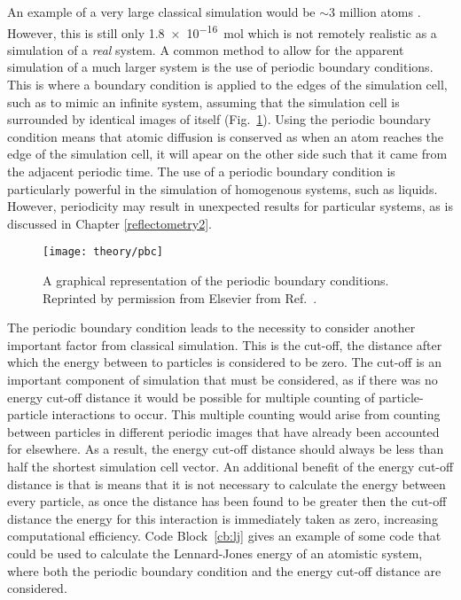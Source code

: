 An example of a very large classical simulation would be $\sim3$ million atoms \cite{Gumbart2009}.
However, this is still only \SI{1.8e-16}{\mol} which is not remotely realistic as a simulation of a \emph{real} system.
A common method to allow for the apparent simulation of a much larger system is the use of periodic boundary conditions.
This is where a boundary condition is applied to the edges of the simulation cell, such as to mimic an infinite system, assuming that the simulation cell is surrounded by identical images of itself (Fig.~\ref{fig:pbc}).
Using the periodic boundary condition means that atomic diffusion is conserved as when an atom reaches the edge of the simulation cell, it will apear on the other side such that it came from the adjacent periodic time.
The use of a periodic boundary condition is particularly powerful in the simulation of homogenous systems, such as liquids.
However, periodicity may result in unexpected results for particular systems, as is discussed in Chapter \ref{reflectometry2}.
%
\begin{figure}
	\centering
	\texttt{[image: theory/pbc]}
	\caption{A graphical representation of the periodic boundary conditions. Reprinted by permission from Elsevier\textsuperscript{\textcopyright} from Ref.~\cite{Frenkel1996}.}
	\label{fig:pbc}
\end{figure}
%

The periodic boundary condition leads to the necessity to consider another important factor from classical simulation.
This is the cut-off, the distance after which the energy between to particles is considered to be zero.
The cut-off is an important component of simulation that must be considered, as if there was no energy cut-off distance it would be possible for multiple counting of particle-particle interactions to occur.
This multiple counting would arise from counting between particles in different periodic images that have already been accounted for elsewhere.
As a result, the energy cut-off distance should always be less than half the shortest simulation cell vector.
An additional benefit of the energy cut-off distance is that is means that it is not necessary to calculate the energy between every particle, as once the distance has been found to be greater then the cut-off distance the energy for this interaction is immediately taken as zero, increasing computational efficiency.
Code Block~\ref{cb:lj} gives an example of some code that could be used to calculate the Lennard-Jones energy of an atomistic system, where both the periodic boundary condition and the energy cut-off distance are considered.
%
\begin{figure}
	\centering
	\begin{minipage}{0.86\textwidth}
		
	\end{minipage}
\end{figure}
%

